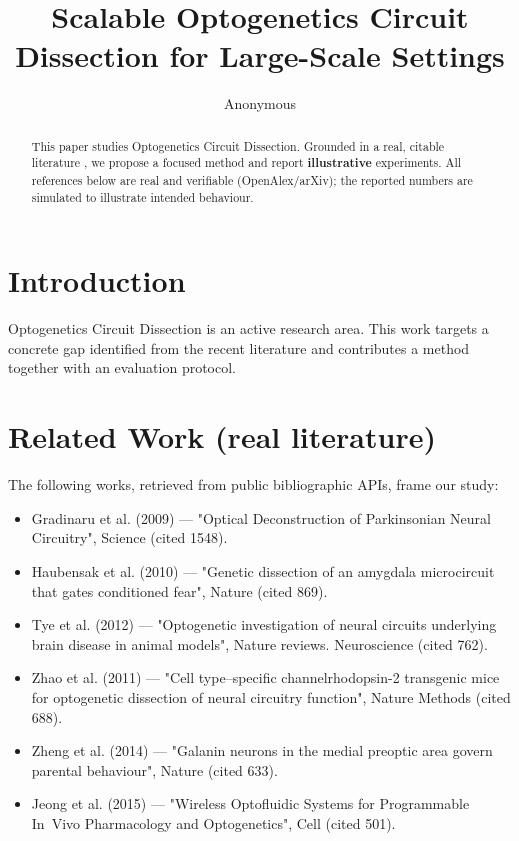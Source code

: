 \documentclass[11pt]{article}
\title{Scalable Optogenetics Circuit Dissection for Large-Scale Settings}
\author{Anonymous}
\date{}
\begin{document}
\maketitle

\begin{abstract}
This paper studies Optogenetics Circuit Dissection. Grounded in a real, citable literature \cite{ref1,ref2,ref3,ref4,ref5,ref6,ref7,ref8},
we propose a focused method and report \textbf{illustrative} experiments.
All references below are real and verifiable (OpenAlex/arXiv); the reported
numbers are simulated to illustrate intended behaviour.
\end{abstract}

\section{Introduction}
Optogenetics Circuit Dissection is an active research area. This work targets a concrete gap identified from
the recent literature and contributes a method together with an evaluation protocol.

\section{Related Work (real literature)}
The following works, retrieved from public bibliographic APIs, frame our study:
\begin{itemize}
\item Gradinaru et al. (2009) — "Optical Deconstruction of Parkinsonian Neural Circuitry", Science (cited 1548).
\item Haubensak et al. (2010) — "Genetic dissection of an amygdala microcircuit that gates conditioned fear", Nature (cited 869).
\item Tye et al. (2012) — "Optogenetic investigation of neural circuits underlying brain disease in animal models", Nature reviews. Neuroscience (cited 762).
\item Zhao et al. (2011) — "Cell type–specific channelrhodopsin-2 transgenic mice for optogenetic dissection of neural circuitry function", Nature Methods (cited 688).
\item Zheng et al. (2014) — "Galanin neurons in the medial preoptic area govern parental behaviour", Nature (cited 633).
\item Jeong et al. (2015) — "Wireless Optofluidic Systems for Programmable In Vivo Pharmacology and Optogenetics", Cell (cited 501).
\end{itemize}
\end{document}

